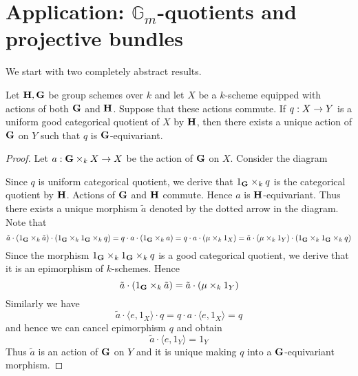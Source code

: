\section{Application: $\mathbb{G}_m$-quotients and projective bundles}
\noindent
We start with two completely abstract results.

\begin{proposition}\label{proposition:commuting_actions_induce_action_on_quotient}
Let $\mathbf{H},\mathbf{G}$ be group schemes over $k$ and let $X$ be a $k$-scheme equipped with actions of both $\mathbf{G}$ and $\mathbf{H}$. Suppose that these actions commute. If $q:X\rightarrow Y$ is a uniform good categorical quotient of $X$ by $\mathbf{H}$, then there exists a unique action of $\mathbf{G}$ on $Y$ such that $q$ is $\mathbf{G}$-equivariant.
\end{proposition}
\begin{proof}
Let $a:\mathbf{G}\times_kX\rightarrow X$ be the action of $\mathbf{G}$ on $X$. Consider the diagram
\begin{center}
\end{center}
Since $q$ is uniform categorical quotient, we derive that $1_{\mathbf{G}}\times_kq$ is the categorical quotient by $\mathbf{H}$. Actions of $\mathbf{G}$ and $\mathbf{H}$ commute. Hence $a$ is $\mathbf{H}$-equivariant. Thus there exists a unique morphism $\tilde{a}$ denoted by the dotted arrow in the diagram. Note that 
$$\tilde{a}\cdot \left(1_{\mathbf{G}}\times_k\tilde{a}\right)\cdot \left(1_{\mathbf{G}}\times_k1_{\mathbf{G}}\times_kq\right) = q \cdot a \cdot \left(1_{\mathbf{G}}\times_ka\right) =q\cdot a \cdot \left(\mu\times_k1_{X}\right) = \tilde{a}\cdot \left(\mu \times_k 1_{Y}\right) \cdot \left(1_{\mathbf{G}} \times_k 1_{\mathbf{G}}\times_k q \right)$$
Since the morphism $1_{\mathbf{G}}\times_k1_{\mathbf{G}}\times_kq$ is a good categorical quotient, we derive that it is an epimorphism of $k$-schemes. Hence
$$\tilde{a}\cdot \left(1_{\mathbf{G}}\times_k\tilde{a}\right)= \tilde{a}\cdot \left(\mu\times_k1_{Y}\right)$$
Similarly we have
$$\tilde{a}\cdot \langle e, 1_{X}\rangle \cdot q = q \cdot a \cdot \langle e, 1_{X}\rangle = q$$
and hence we can cancel epimorphism $q$ and obtain
$$\tilde{a}\cdot \langle e, 1_{Y}\rangle = 1_{Y}$$
Thus $\tilde{a}$ is an action of $\mathbf{G}$ on $Y$ and it is unique making $q$ into a $\mathbf{G}$-equivariant morphism.
\end{proof}

